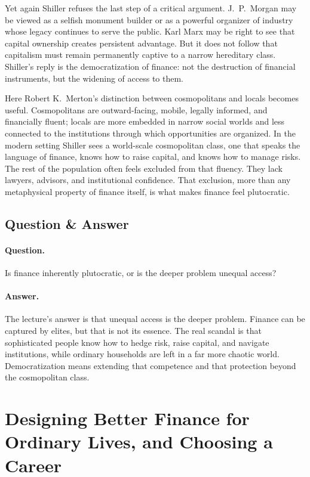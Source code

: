 Yet again Shiller refuses the last step of a critical argument. J.\ P.\ Morgan may be viewed as a selfish monument builder or as a powerful organizer of industry whose legacy continues to serve the public. Karl Marx may be right to see that capital ownership creates persistent advantage. But it does not follow that capitalism must remain permanently captive to a narrow hereditary class. Shiller's reply is the democratization of finance: not the destruction of financial instruments, but the widening of access to them.

Here Robert K.~Merton's distinction between cosmopolitans and locals becomes useful. Cosmopolitans are outward-facing, mobile, legally informed, and financially fluent; locals are more embedded in narrow social worlds and less connected to the institutions through which opportunities are organized. In the modern setting Shiller sees a world-scale cosmopolitan class, one that speaks the language of finance, knows how to raise capital, and knows how to manage risks. The rest of the population often feels excluded from that fluency. They lack lawyers, advisors, and institutional confidence. That exclusion, more than any metaphysical property of finance itself, is what makes finance feel plutocratic.

\subsection{Question \& Answer}

\paragraph{Question.} Is finance inherently plutocratic, or is the deeper problem unequal access?

\paragraph{Answer.} The lecture's answer is that unequal access is the deeper problem. Finance can be captured by elites, but that is not its essence. The real scandal is that sophisticated people know how to hedge risk, raise capital, and navigate institutions, while ordinary households are left in a far more chaotic world. Democratization means extending that competence and that protection beyond the cosmopolitan class.

\section{Designing Better Finance for Ordinary Lives, and Choosing a Career}

